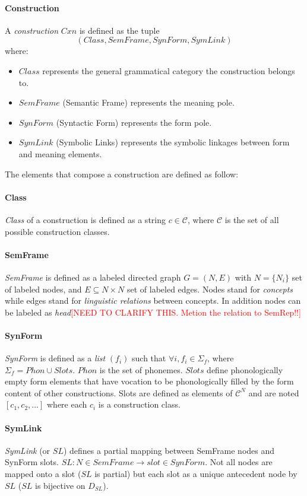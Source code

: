 \documentclass{article}
\newcommand\todo[1]{\textcolor{red}{#1}}
\begin{document}
\paragraph{Construction}
A \emph{construction} $Cxn$ is defined as the tuple  $$(Class, SemFrame, SynForm, SymLink)$$ where:
\begin{itemize}
	\item $Class$ represents the general grammatical category the construction belongs to.
	\item $SemFrame$ (Semantic Frame) represents the meaning pole.
	\item $SynForm$ (Syntactic Form) represents the form pole.
	\item $SymLink$ (Symbolic Links) represents the symbolic linkages between form and meaning elements.
\end{itemize}
The elements that compose a construction are defined as follow:

\paragraph{Class}
\emph{Class} of a construction is defined as a string $c \in \mathcal{C}$, where $\mathcal{C}$ is the set of all possible construction classes.
 
\paragraph{SemFrame}
\emph{SemFrame} is defined as a labeled directed graph $G = (N,E)$ with $N = \lbrace N_i \rbrace$ set of labeled nodes, and $E \subseteq N \times N$ set of labeled edges. Nodes stand for \emph{concepts} while edges stand for \emph{linguistic relations} between concepts. In addition nodes can be labeled as \emph{head}\todo{[NEED TO CLARIFY THIS. Metion the relation to SemRep!!]}

\paragraph{SynForm}
\emph{SynForm} is defined as a \emph{list} $(f_i)$ such that $\forall i, f_i \in \Sigma_f$, where $\Sigma_f = Phon \cup Slots$. $Phon$ is the set of phonemes. $Slots$ define phonologically empty form elements that have vocation to be phonologically filled by the form content of other constructions. Slots are defined as elements of $\mathcal{C}^N$ and are noted $[c_1, c_2,...]$ where each $c_i$ is a construction class.

\paragraph{SymLink}
\emph{SymLink} (or $SL$) defines a partial mapping between SemFrame nodes and SynForm slots. $SL: N \in SemFrame \rightarrow slot \in SynForm$. Not all nodes are mapped onto a slot ($SL$ is partial) but each slot as a unique antecedent node by $SL$ ($SL$ is bijective on $D_{SL}$).
\end{document}
